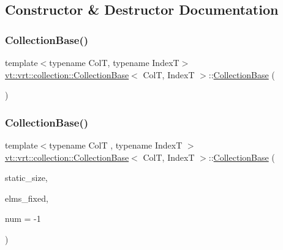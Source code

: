 \subsection{Constructor \& Destructor Documentation}
\mbox{\label{structvt_1_1vrt_1_1collection_1_1_collection_base_ab2134eca144d6b2703fffb12c71d9f9b}} 
\subsubsection{\texorpdfstring{Collection\+Base()}{CollectionBase()}\hspace{0.1cm}{\footnotesize\ttfamily [1/2]}}
{\footnotesize\ttfamily template$<$typename ColT, typename IndexT$>$ \\
\hyperlink{structvt_1_1vrt_1_1collection_1_1_collection_base}{vt\+::vrt\+::collection\+::\+Collection\+Base}$<$ ColT, IndexT $>$\+::\hyperlink{structvt_1_1vrt_1_1collection_1_1_collection_base}{Collection\+Base} (\begin{DoxyParamCaption}{ }\end{DoxyParamCaption})\hspace{0.3cm}{\ttfamily [default]}}

\mbox{\label{structvt_1_1vrt_1_1collection_1_1_collection_base_a265f5fb675e04d9ea6ec332743bc6d14}} 
\subsubsection{\texorpdfstring{Collection\+Base()}{CollectionBase()}\hspace{0.1cm}{\footnotesize\ttfamily [2/2]}}
{\footnotesize\ttfamily template$<$typename ColT , typename IndexT $>$ \\
\hyperlink{structvt_1_1vrt_1_1collection_1_1_collection_base}{vt\+::vrt\+::collection\+::\+Collection\+Base}$<$ ColT, IndexT $>$\+::\hyperlink{structvt_1_1vrt_1_1collection_1_1_collection_base}{Collection\+Base} (\begin{DoxyParamCaption}\item[{bool const}]{static\+\_\+size,  }\item[{bool const}]{elms\+\_\+fixed,  }\item[{\hyperlink{namespacevt_ac115668758184050beff7a9281a2c490}{Virtual\+Elm\+Count\+Type} const}]{num = {\ttfamily -\/1} }\end{DoxyParamCaption})}

